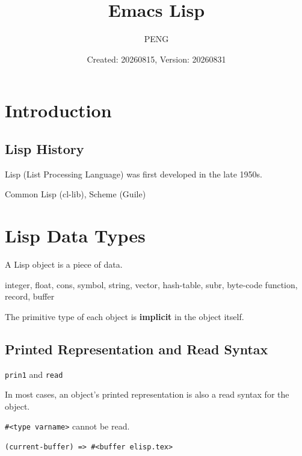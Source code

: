\documentclass{article}
\title{Emacs Lisp}
\author{PENG}
\date{Created: 20260815, Version: 20260831}
\begin{document}
\maketitle
\tableofcontents

\section{Introduction}
\subsection{Lisp History}
Lisp (List Processing Language) was first developed in the late 1950s.

Common Lisp (cl-lib), Scheme (Guile)

\section{Lisp Data Types}
\begin{definition}[object]
    A Lisp object is a piece of data.
\end{definition}

\begin{definition}
    integer, float, cons, symbol, string, vector, hash-table, subr, byte-code function, record, buffer
\end{definition}

\begin{remark}
    The primitive type of each object is \textbf{implicit} in the object itself.
\end{remark}

\subsection{Printed Representation and Read Syntax}
\begin{definition}
    \verb|prin1| and \verb|read|
\end{definition}

\begin{remark}
    In most cases, an object's printed representation is also a read syntax for the object.
\end{remark}

\begin{example}
    \verb|#<type varname>| cannot be read.
    \begin{verbatim}
(current-buffer) => #<buffer elisp.tex>
\end{verbatim}
\end{example}
\end{document}
